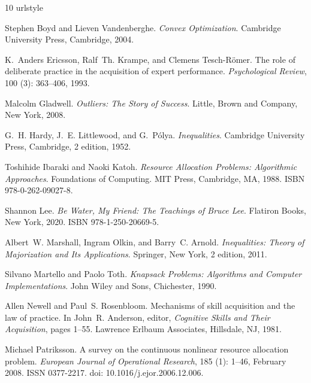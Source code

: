 \documentclass[11pt]{article}
\theoremstyle{definition}
\theoremstyle{remark}
\begin{document}
\begin{thebibliography}{10}
\providecommand{\natexlab}[1]{#1}
\providecommand{\url}[1]{\texttt{#1}}
\expandafter\ifx\csname urlstyle\endcsname\relax
  \providecommand{\doi}[1]{doi: #1}\else
  \providecommand{\doi}{doi: \begingroup \urlstyle{rm}\Url}\fi

Stephen Boyd and Lieven Vandenberghe.
\newblock \emph{Convex Optimization}.
\newblock Cambridge University Press, Cambridge, 2004.

K.~Anders Ericsson, Ralf~Th. Krampe, and Clemens Tesch-R{\"o}mer.
\newblock The role of deliberate practice in the acquisition of expert
  performance.
\newblock \emph{Psychological Review}, 100 (3): 363--406,
  1993.

Malcolm Gladwell.
\newblock \emph{Outliers: The Story of Success}.
\newblock Little, Brown and Company, New York, 2008.

G.~H. Hardy, J.~E. Littlewood, and G.~P{\'o}lya.
\newblock \emph{Inequalities}.
\newblock Cambridge University Press, Cambridge, 2 edition, 1952.

Toshihide Ibaraki and Naoki Katoh.
\newblock \emph{Resource Allocation Problems: Algorithmic Approaches}.
\newblock Foundations of Computing. MIT Press, Cambridge, MA, 1988.
\newblock ISBN 978-0-262-09027-8.

Shannon Lee.
\newblock \emph{Be Water, My Friend: The Teachings of Bruce Lee}.
\newblock Flatiron Books, New York, 2020.
\newblock ISBN 978-1-250-20669-5.

Albert~W. Marshall, Ingram Olkin, and Barry~C. Arnold.
\newblock \emph{Inequalities: Theory of Majorization and Its Applications}.
\newblock Springer, New York, 2 edition, 2011.

Silvano Martello and Paolo Toth.
\newblock \emph{Knapsack Problems: Algorithms and Computer Implementations}.
\newblock John Wiley and Sons, Chichester, 1990.

Allen Newell and Paul~S. Rosenbloom.
\newblock Mechanisms of skill acquisition and the law of practice.
\newblock In John~R. Anderson, editor, \emph{Cognitive Skills and Their
  Acquisition}, pages 1--55. Lawrence Erlbaum Associates, Hillsdale, NJ, 1981.

Michael Patriksson.
\newblock A survey on the continuous nonlinear resource allocation problem.
\newblock \emph{European Journal of Operational Research}, 185
  (1): 1--46, February 2008.
\newblock ISSN 0377-2217.
\newblock \doi{10.1016/j.ejor.2006.12.006}.

\end{thebibliography}


%
%
\end{document}
